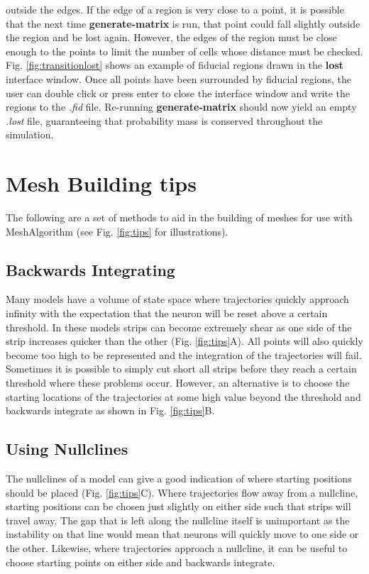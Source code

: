 \documentclass[utf8]{frontiers_suppmat} %
\begin{document}
outside the edges. If the edge of a region is very close to a point, it is possible that the next time \textbf{generate-matrix} is run, that point could fall slightly outside the region and be lost again. However, the edges of the region must be close enough to the points to limit the number of cells whose distance must be checked. Fig. \ref{fig:transitionlost} shows an example of fiducial regions drawn in the \textbf{lost} interface window. Once all points have been surrounded by fiducial regions, the user can double click or press enter to close the interface window and write the regions to the \textit{.fid} file. Re-running \textbf{generate-matrix} should now yield an empty \textit{.lost} file, guaranteeing that probability mass is conserved throughout the simulation.

\section{Mesh Building tips}
\label{meshtips}
The following are a set of methods to aid in the building of meshes for use with MeshAlgorithm (see Fig. \ref{fig:tips} for illustrations).\\

\subsection{Backwards Integrating}
Many models have a volume of state space where trajectories quickly approach infinity with the expectation that the neuron will be reset above a certain threshold. In these models strips can become extremely shear as one side of the strip increases quicker than the other (Fig. \ref{fig:tips}A). All points will also quickly become too high to be represented and the integration of the trajectories will fail. Sometimes it is possible to simply cut short all strips before they reach a certain threshold where these problems occur. However, an alternative is to choose the starting locations of the trajectories at some high value beyond the threshold and backwards integrate as shown in Fig. \ref{fig:tips}B.\\

\subsection{Using Nullclines}
The nullclines of a model can give a good indication of where starting positions should be placed (Fig. \ref{fig:tips}C). Where trajectories flow away from a nullcline, starting positions can be chosen just slightly on either side such that strips will travel away. The gap that is left along the nullcline itself is unimportant as the instability on that line would mean that neurons will quickly move to one side or the other. Likewise, where trajectories approach a nullcline, it can be useful to choose starting points on either side and backwards integrate.\\
\end{document}
